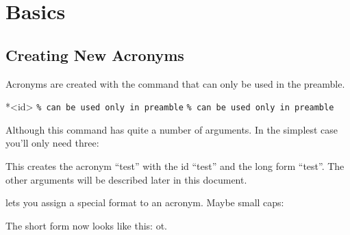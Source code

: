 \documentclass[DIV10,toc=index,toc=bib]{cnpkgdoc}
\begin{document}
\section{Basics}
\subsection{Creating New Acronyms}
Acronyms are created with the command  that can only be used in
the preamble.
\begin{beschreibung}
 *{<id>}
 \verb+% can be used only in preamble+
  \verb+% can be used only in preamble+
\end{beschreibung}
Although this command has quite a number of arguments. In the simplest case you'll
only need three:
\begin{beispiel}
\end{beispiel}
This creates the acronym ``\acs{test}'' with the \acs{id} ``test'' and the long
form ``\acl{test}''. The other arguments will be described later in this document.

 lets you assign a special format to an acronym. Maybe
small caps:
\begin{beispiel}
\end{beispiel}
The short form now looks like this: \acs{ot}.
\end{document}

